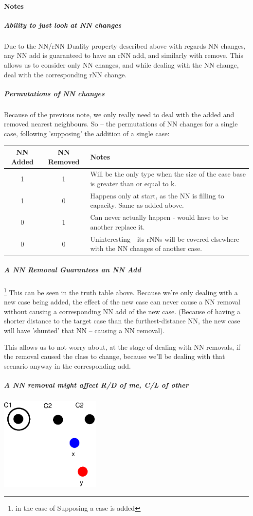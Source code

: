 \documentclass[a4paper,11pt]{report}
\begin{document}
\paragraph{Notes}
\subparagraph{Ability to just look at NN changes}
Due to the NN/rNN Duality property described above with regards NN changes, any NN add is guaranteed to have an rNN add, and similarly with remove. This allows us to consider only NN changes, and while dealing with the NN change, deal with the corresponding rNN change.

\subparagraph{Permutations of NN changes}
Because of the previous note, we only really need to deal with the added and removed nearest neighbours. So – the permutations of NN changes for a single case, following 'supposing' the addition of a single case:

\begin{tabular}{ | c | c | p{5cm} |}
	NN Added & NN Removed & Notes \\ \hline
	1 & 1 & Will be the only type when the size of the case base is greater than or equal to  k. \\ \hline
	1 & 0 & Happens only at start, as the NN is filling to capacity. Same as added above. \\ \hline
	0 & 1 & Can never actually happen - would have to be another replace it. \\ \hline
	0 & 0 & Uninteresting - its rNNs will be covered elsewhere with the NN changes of another case. \\ \hline
\end{tabular}

\subparagraph{A NN Removal Guarantees an NN Add} \footnote{in the case of Supposing a case is added}
This can be seen in the truth table above. Because we're only dealing with a new case being added, the effect of the new case can never cause a NN removal without causing a corresponding NN add of the new case. (Because of having a shorter distance to the target case than the furthest-distance NN, the new case will have 'shunted' that NN – causing a NN removal).

This allows us to not worry about, at the stage of dealing with NN removals, if the removal caused the class to change, because we'll be dealing with that scenario anyway in the corresponding add.

\subparagraph{A NN removal might affect R/D of me, C/L of other}
\includegraphics[width=5cm]{NnMightAffectEg}
\end{document}
